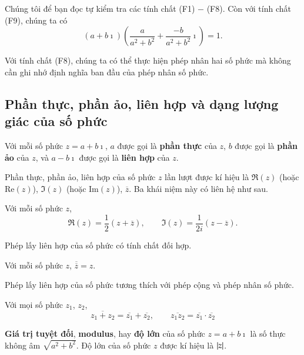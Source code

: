 Chúng tôi để bạn đọc tự kiểm tra các tính chất (F1) $-$ (F8). Còn với tính chất (F9), chúng ta có
\[
	(a + b\imath)\left(\frac{a}{a^{2}+b^{2}} + \frac{-b}{a^{2}+b^{2}}\imath\right) = 1.
\]

Với tính chất (F8), chúng ta có thể thực hiện phép nhân hai số phức mà không cần ghi nhớ định nghĩa ban đầu của phép nhân số phức.

\subsection{Phần thực, phần ảo, liên hợp và dạng lượng giác của số phức}

\begin{definition}
	Với mỗi số phức $z = a + b\imath$, $a$ được gọi là \textbf{phần thực} của $z$, $b$ được gọi là \textbf{phần ảo} của $z$, và $a - b\imath$ được gọi là \textbf{liên hợp} của $z$.

\end{definition}

Phần thực, phần ảo, liên hợp của số phức $z$ lần lượt được kí hiệu là $\Re{(z)}$ (hoặc $\text{Re}(z)$), $\Im{(z)}$ (hoặc $\text{Im}(z)$), $\overline{z}$. Ba khái niệm này có liên hệ như sau.

\begin{theorem}
	Với mỗi số phức $z$,
	\[
		\Re{(z)} = \frac{1}{2}(z + \overline{z}),\qquad \Im{(z)} = \frac{1}{2i}(z - \overline{z}).
	\]
\end{theorem}

Phép lấy liên hợp của số phức có tính chất đối hợp.
\begin{theorem}
	Với mỗi số phức $z$, $\overline{\overline{z}} = z$.
\end{theorem}

Phép lấy liên hợp của số phức tương thích với phép cộng và phép nhân số phức.
\begin{theorem}
	Với mọi số phức $z_{1}$, $z_{2}$,
	\[
		\overline{z_{1} + z_{2}} = \overline{z_{1}} + \overline{z_{2}},\qquad \overline{z_{1}z_{2}} = \overline{z_{1}}\cdot\overline{z_{2}}
	\]
\end{theorem}

\begin{definition}
	\textbf{Giá trị tuyệt đối}, \textbf{modulus}, hay \textbf{độ lớn} của số phức $z = a + b\imath$ là số thực không âm $\sqrt{a^{2} + b^{2}}$. Độ lớn của số phức $z$ được kí hiệu là $\left\vert{z}\right\vert$.
\end{definition}

